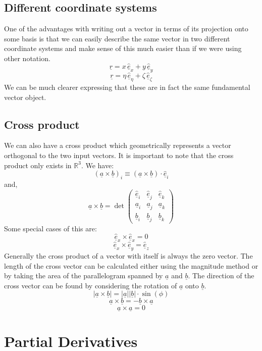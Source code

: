 \documentclass[12pt]{article}
\newcommand{\uvec}[1]{\underline{\hat{#1}}}
\newcommand{\bvec}[1]{\uvec{e}_#1}
\begin{document}
\subsection*{Different coordinate systems}
One of the advantages with writing out a vector in terms of its projection onto some basis is that we can easily describe the same vector in two different coordinate systems and make sense of this much easier than if we were using other notation.
\[\underline{r}=x\,\bvec{x}+y\,\bvec{y}\]
\[\underline{r}=\eta\,\bvec{\eta}+\zeta\,\bvec{\zeta}\]
We can be much clearer expressing that these are in fact the same fundamental vector object.
\subsection*{Cross product}
We can also have a cross product which geometrically represents a vector orthogonal to the two input vectors. It is important to note that the cross product only exists in \(\mathbb{R}^3\). We have:
\[(\underline{a}\times\underline{b})_i\equiv(\underline{a}\times\underline{b})\cdot\bvec{i}\]
and,
\[\underline{a}\times\underline{b}=\det\begin{pmatrix}
    \bvec{i} & \bvec{j} & \bvec{k} \\
    \underline{a}_i & \underline{a}_j & \underline{a}_k \\
    \underline{b}_i & \underline{b}_j & \underline{b}_k
\end{pmatrix}\]
Some special cases of this are:
\[\bvec{x}\times\bvec{x}=0\]
\[\bvec{x}\times\bvec{y}=\bvec{z}\]
Generally the cross product of a vector with itself is always the zero vector. The length of the cross vector can be calculated either using the magnitude method or by taking the area of the parallelogram spanned by \(\underline{a}\) and \(\underline{b}\). The direction of the cross vector can be found by considering the rotation of \(\underline{a}\) onto \(\underline{b}\).
\[|\underline{a}\times\underline{b}|=|\underline{a}||\underline{b}|\cdot\sin{(\phi)}\]
\[\underline{a}\times\underline{b}=-\underline{b}\times\underline{a}\]
\[\underline{a}\times\underline{a}=0\]
\section{Partial Derivatives}
\end{document}
